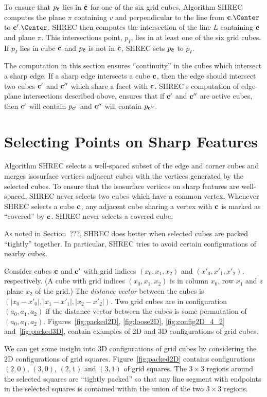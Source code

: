 To ensure that $p_{{\tilde{\mathbf{c}}}}$ lies in ${\tilde{\mathbf{c}}}$ for one of the six grid cubes,
Algorithm SHREC computes the plane $\pi$ containing $v$
and perpendicular to the line from $\cb.\Center$ to $\cb'.\Center$.
SHREC then computes the intersection of the line $L$ containing $\mathbf{e}$
and plane $\pi$.
This intersections point, $p_I$, lies in at least one of the six grid cubes.
If $p_I$ lies in cube ${\tilde{\mathbf{c}}}$ and $p_{{\tilde{\mathbf{c}}}}$ is not in ${\tilde{\mathbf{c}}}$,
SHREC sets $p_{{\tilde{\mathbf{c}}}}$ to $p_I$.

The computation in this section ensures ``continuity'' in the cubes
which intersect a sharp edge.
If a sharp edge intersects a cube $\mathbf{c}$,
then the edge should intersect two cubes $\mathbf{c}'$ and $\mathbf{c}''$
which share a facet with $\mathbf{c}$.
SHREC's computation of edge-plane intersections described above,
ensures that if $\mathbf{c}'$ and $\mathbf{c}''$ are active cubes,
then $\mathbf{c}'$ will contain $p_{\mathbf{c}'}$ and $\mathbf{c}''$ will contain $p_{\mathbf{c}''}$.

\section{Selecting Points on Sharp Features}
\label{section:selection}

Algorithm SHREC selects a well-spaced subset of the edge and corner cubes
and merges isosurface vertices adjacent cubes 
with the vertices generated by the selected cubes.
To ensure that the isosurface vertices on sharp features are well-spaced,
SHREC never selects two cubes which have a common vertex.
Whenever SHREC selects a cube $\mathbf{c}$,
any adjacent cube sharing a vertex with $\mathbf{c}$ is marked as ``covered''
by $\mathbf{c}$.
SHREC never selects a covered cube.

As noted in Section~???, 
SHREC does better when selected cubes 
are packed ``tightly'' together.
In particular, SHREC tries to avoid certain configurations of nearby cubes.

Consider cubes $\mathbf{c}$ and $\mathbf{c}'$ with grid indices $(x_0,x_1,x_2)$
and $(x'_0,x'_1,x'_2)$, respectively.
(A cube with grid indices $(x_0,x_1,x_2)$ is in column $x_0$, row $x_1$
and $z$-plane $x_2$ of the grid.)
The {\em distance vector} between the cubes is
$(|x_0-x'_0|, |x_1-x'_1|, |x_2-x'_2|)$.
Two grid cubes are in configuration $(a_0,a_1,a_2)$ if the distance vector
between the cubes is some permutation of $(a_0,a_1,a_2)$.
Figures~\ref{fig:packed2D}, \ref{fig:loose2D}, \ref{fig:config2D_4_2}
and~\ref{fig:packed3D},
contain examples of 2D and 3D configurations of grid cubes.

We can get some insight into 3D configurations of grid cubes
by considering the 2D configurations of grid squares.
Figure~\ref{fig:packed2D} contains configurations $(2,0)$, $(3,0)$,
$(2,1)$ and $(3,1)$ of grid squares.
The $3 \times 3$ regions around the selected squares are ``tightly packed''
so that any line segment with endpoints in the selected squares
is contained within the union of the two $3 \times 3$ regions.

